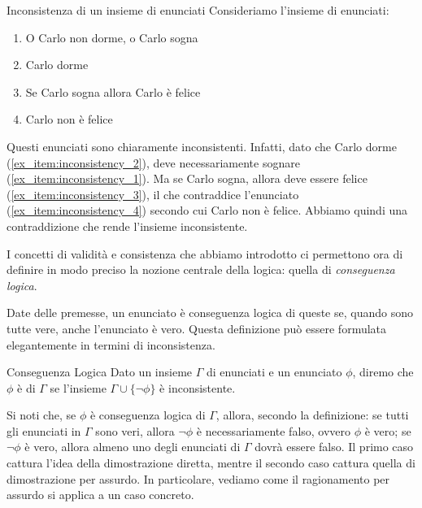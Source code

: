 \begin{example}{Inconsistenza di un insieme di enunciati}
  Consideriamo l'insieme di enunciati:
  \begin{enumerate}
    \item O Carlo non dorme, o Carlo sogna\label{ex_item:inconsistency_1}
    \item Carlo dorme\label{ex_item:inconsistency_2}
    \item Se Carlo sogna allora Carlo è felice\label{ex_item:inconsistency_3}
    \item Carlo non è felice\label{ex_item:inconsistency_4}
  \end{enumerate}

  Questi enunciati sono chiaramente inconsistenti. Infatti, dato che Carlo dorme (\ref{ex_item:inconsistency_2}), deve necessariamente sognare (\ref{ex_item:inconsistency_1}). 
  Ma se Carlo sogna, allora deve essere felice (\ref{ex_item:inconsistency_3}), il che contraddice l'enunciato (\ref{ex_item:inconsistency_4}) secondo cui Carlo non è felice.
  Abbiamo quindi una contraddizione che rende l'insieme inconsistente.
\end{example}

I concetti di validità e consistenza che abbiamo introdotto ci permettono ora di definire in modo preciso la nozione centrale della logica: quella di \textit{conseguenza logica}.

Date delle premesse, un enunciato è conseguenza logica di queste se, quando sono tutte vere, anche l'enunciato è vero.
Questa definizione può essere formulata elegantemente in termini di inconsistenza.

\begin{definition}{Conseguenza Logica}
  Dato un insieme \(\Gamma\) di enunciati e un enunciato \(\phi\), diremo che \(\phi\) è  di \(\Gamma\) se l'insieme \(\Gamma \cup \{\neg \phi\}\) è inconsistente. %
\end{definition}

Si noti che, se \(\phi\) è conseguenza logica di \(\Gamma\), allora, secondo la definizione: se tutti gli enunciati in \(\Gamma\) sono veri, allora \(\neg \phi\) è necessariamente falso, ovvero \(\phi\) è vero; se \(\neg \phi\) è vero, allora almeno uno degli enunciati di \(\Gamma\) dovrà essere falso. Il primo caso cattura l'idea della dimostrazione diretta, mentre il secondo caso cattura quella di dimostrazione per assurdo.
In particolare, vediamo come il ragionamento per assurdo si applica a un caso concreto.

